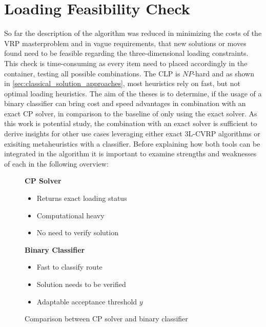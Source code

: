 \section{Loading Feasibility Check}
\label{sec:FeasibilityCheck}
So far the description of the algorithm was reduced in minimizing the costs of the \gls{VRP} masterproblem and in vague
requirements, that new solutions or moves found need to be feasible regarding the three-dimensional loading constraints.
This check is time-consuming as every item need to placed accordingly in the container, testing all possible combinations.
The \gls{CLP} is $NP$-hard and as shown in \ref{sec:classical_solution_approaches}, most heuristics rely on fast, but not
optimal loading heuristics. The aim of the theses is to determine, if the usage of a binary classifier can bring cost and
speed advantages in combination with an exact \gls{CP} solver, in comparison to the baseline of only using the exact solver.
As this work is potential study, the combination with an exact solver is sufficient to derive insights for other use cases
leveraging either exact \gls{3L-CVRP} algorithms or exisiting metaheuristics with a classifier.
Before explaining how both tools can be integrated in the algorithm it is important to examine strengths and weaknesses of
each in the following overview:
\begin{figure}[ht]
    \centering
    \begin{minipage}[centering]{0.45\textwidth}
        \textbf{CP Solver}
        \begin{itemize}
            \item Returns exact loading status
            \item Computational heavy
            \item No need to verify solution
        \end{itemize}
    \end{minipage}
    \begin{minipage}[centering]{0.45\textwidth}
        \textbf{Binary Classifier}
        \begin{itemize}
            \item Fast to classify route
            \item Solution needs to be verified
            \item Adaptable acceptance threshold $y$
        \end{itemize}
    \end{minipage}
    \caption{Comparison between CP solver and binary classifier}
    \label{fig:comparison_classifier_cpSolver}
\end{figure}

